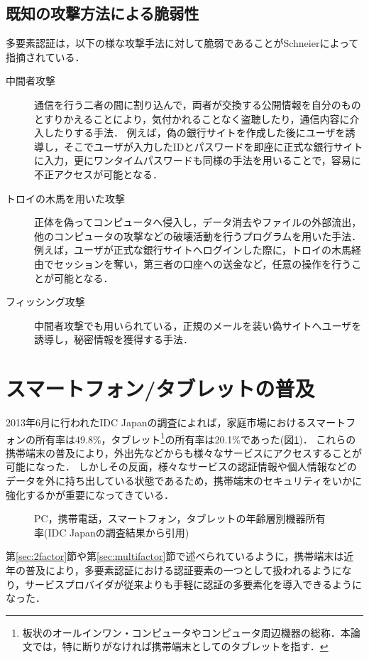 \subsection{既知の攻撃方法による脆弱性}
多要素認証は，以下の様な攻撃手法に対して脆弱であることがSchneier\cite{Schneier:2005:TAT:1053291.1053327}によって指摘されている．
\begin{description}
  \item[中間者攻撃]
    通信を行う二者の間に割り込んで，両者が交換する公開情報を自分のものとすりかえることにより，気付かれることなく盗聴したり，通信内容に介入したりする手法．
    例えば，偽の銀行サイトを作成した後にユーザを誘導し，そこでユーザが入力したIDとパスワードを即座に正式な銀行サイトに入力，更にワンタイムパスワードも同様の手法を用いることで，容易に不正アクセスが可能となる．
  \item[トロイの木馬を用いた攻撃]
    正体を偽ってコンピュータへ侵入し，データ消去やファイルの外部流出，他のコンピュータの攻撃などの破壊活動を行うプログラムを用いた手法．
    例えば，ユーザが正式な銀行サイトへログインした際に，トロイの木馬経由でセッションを奪い，第三者の口座への送金など，任意の操作を行うことが可能となる．
  \item[フィッシング攻撃]
    中間者攻撃でも用いられている，正規のメールを装い偽サイトへユーザを誘導し，秘密情報を獲得する手法．
\end{description}

\section{スマートフォン/タブレットの普及}
2013年6月に行われたIDC Japanの調査\cite{idcsmartphone}によれば，家庭市場におけるスマートフォンの所有率は49.8\%，タブレット\footnote{板状のオールインワン・コンピュータやコンピュータ周辺機器の総称．本論文では，特に断りがなければ携帯端末としてのタブレットを指す．}の所有率は20.1\%であった(図\ref{fig:smartphoneUsage})．
これらの携帯端末の普及により，外出先などからも様々なサービスにアクセスすることが可能になった．
しかしその反面，様々なサービスの認証情報や個人情報などのデータを外に持ち出している状態であるため，携帯端末のセキュリティをいかに強化するかが重要になってきている．

\begin{figure}[th]
\begin{center}
\end{center}
\caption{PC，携帯電話，スマートフォン，タブレットの年齢層別機器所有率(IDC Japanの調査結果\cite{idcsmartphone}から引用)}
\label{fig:smartphoneUsage}
\end{figure}

第\ref{sec:2factor}節や第\ref{sec:multifactor}節で述べられているように，携帯端末は近年の普及により，多要素認証における認証要素の一つとして扱われるようになり，サービスプロバイダが従来よりも手軽に認証の多要素化を導入できるようになった．

\newpage
